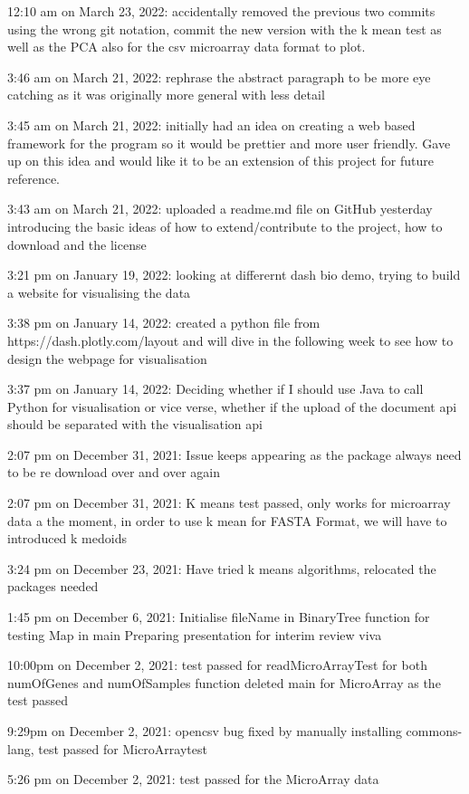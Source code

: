 \documentclass[]{final_report}
\begin{document}
12:10 am on March 23, 2022:
accidentally removed the previous two commits using the wrong git notation, commit the new version with the k mean test as well as the PCA also for the csv microarray data format to plot.

3:46 am on March 21, 2022:
rephrase the abstract paragraph to be more eye catching as it was originally more general with less detail

3:45 am on March 21, 2022:
initially had an idea on creating a web based framework for the program so it would be prettier and more user friendly. Gave up on this idea and would like it to be an extension of this project for future reference.

3:43 am on March 21, 2022:
uploaded a readme.md file on GitHub yesterday introducing the basic ideas of how to extend/contribute to the project, how to download and the license

3:21 pm on January 19, 2022:
looking at differernt dash bio demo, trying to build a website for visualising the data

3:38 pm on January 14, 2022:
created a python file from https://dash.plotly.com/layout and will dive in the following week to see how to design the webpage for visualisation

3:37 pm on January 14, 2022:
Deciding whether if I should use Java to call Python for visualisation or vice verse, whether if the upload of the document api should be separated with the visualisation api

2:07 pm on December 31, 2021:
Issue keeps appearing as the package always need to be re download over and over again

2:07 pm on December 31, 2021:
K means test passed, only works for microarray data a the moment, in order to use k mean for FASTA Format, we will have to introduced k medoids

3:24 pm on December 23, 2021:
Have tried k means algorithms, relocated the packages needed

1:45 pm on December 6, 2021:
Initialise fileName in BinaryTree function for testing Map in main Preparing presentation for interim review viva

10:00pm on December 2, 2021:
test passed for readMicroArrayTest for both numOfGenes and numOfSamples function
deleted main for MicroArray as the test passed

9:29pm on December 2, 2021:
opencsv bug fixed by manually installing commons-lang, test passed for MicroArraytest

5:26 pm on December 2, 2021:
test passed for the MicroArray data
\end{document}
